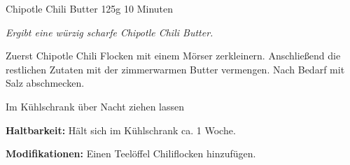 \begin{recipe}{Chipotle Chili Butter} {125g} {10 Minuten}

\freeform
\textit{Ergibt eine würzig scharfe Chipotle Chili Butter.}


Zuerst Chipotle Chili Flocken mit einem Mörser zerkleinern.
Anschließend die restlichen Zutaten mit der zimmerwarmen Butter vermengen.
Nach Bedarf mit Salz abschmecken.

\newstep
Im Kühlschrank über Nacht ziehen lassen

\freeform
\hrulefill

\freeform 
\textbf{Haltbarkeit:}
Hält sich im Kühlschrank ca. 1 Woche.

\freeform 
\textbf{Modifikationen:}
Einen Teelöffel Chiliflocken hinzufügen.

\end{recipe}
